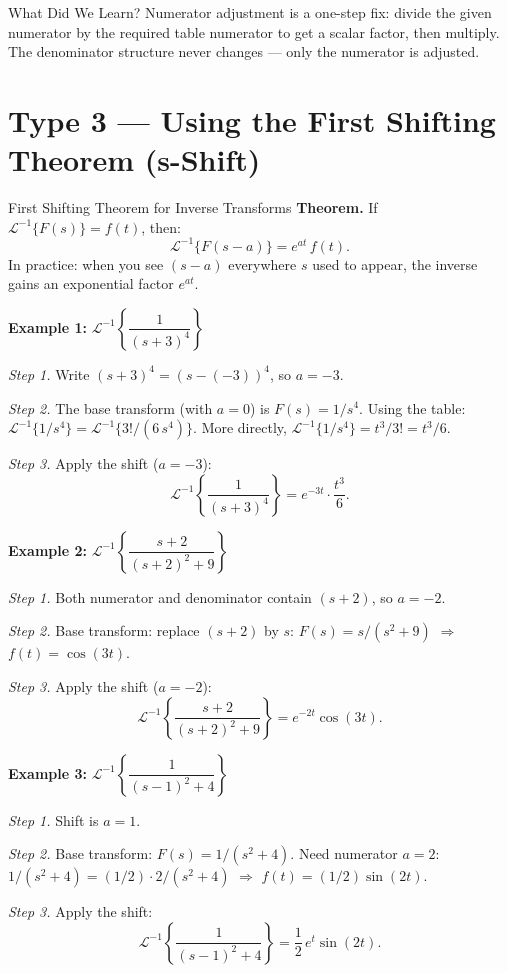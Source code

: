 \documentclass[12pt,a4paper]{article}
\begin{document}
\begin{learnbox}{What Did We Learn?}
Numerator adjustment is a one-step fix: divide the given numerator by the required
table numerator to get a scalar factor, then multiply. The denominator structure never
changes --- only the numerator is adjusted.
\end{learnbox}

\section{Type 3 --- Using the First Shifting Theorem (s-Shift)}

\begin{infobox}{First Shifting Theorem for Inverse Transforms}
\textbf{Theorem.} If $\mathcal{L}^{-1}\{F(s)\} = f(t)$, then:
\[
  \mathcal{L}^{-1}\{F(s-a)\} = e^{at}\,f(t).
\]
In practice: when you see $(s-a)$ everywhere $s$ used to appear, the inverse gains
an exponential factor $e^{at}$.

\medskip
\textbf{Example 1:} $\mathcal{L}^{-1}\left\{\dfrac{1}{(s+3)^4}\right\}$

\textit{Step 1.} Write $(s+3)^4 = (s - (-3))^4$, so $a = -3$.

\textit{Step 2.} The base transform (with $a = 0$) is $F(s) = 1/s^4$.
Using the table: $\mathcal{L}^{-1}\{1/s^4\} = \mathcal{L}^{-1}\{3!/(6\,s^4)\}$. More directly,
$\mathcal{L}^{-1}\{1/s^4\} = t^3/3! = t^3/6$.

\textit{Step 3.} Apply the shift ($a = -3$):
\[
  \mathcal{L}^{-1}\left\{\frac{1}{(s+3)^4}\right\} = e^{-3t}\cdot\frac{t^3}{6}.
\]

\medskip
\textbf{Example 2:} $\mathcal{L}^{-1}\left\{\dfrac{s+2}{(s+2)^2+9}\right\}$

\textit{Step 1.} Both numerator and denominator contain $(s+2)$, so $a = -2$.

\textit{Step 2.} Base transform: replace $(s+2)$ by $s$:
$F(s) = s/(s^2+9)$ $\Rightarrow$ $f(t) = \cos(3t)$.

\textit{Step 3.} Apply the shift ($a = -2$):
\[
  \mathcal{L}^{-1}\left\{\frac{s+2}{(s+2)^2+9}\right\} = e^{-2t}\cos(3t).
\]

\medskip
\textbf{Example 3:} $\mathcal{L}^{-1}\left\{\dfrac{1}{(s-1)^2+4}\right\}$

\textit{Step 1.} Shift is $a = 1$.

\textit{Step 2.} Base transform: $F(s) = 1/(s^2+4)$.
Need numerator $a = 2$: $1/(s^2+4) = (1/2)\cdot 2/(s^2+4)$
$\Rightarrow$ $f(t) = (1/2)\sin(2t)$.

\textit{Step 3.} Apply the shift:
\[
  \mathcal{L}^{-1}\left\{\frac{1}{(s-1)^2+4}\right\} = \frac{1}{2}\,e^{t}\sin(2t).
\]
\end{infobox}
\end{document}
